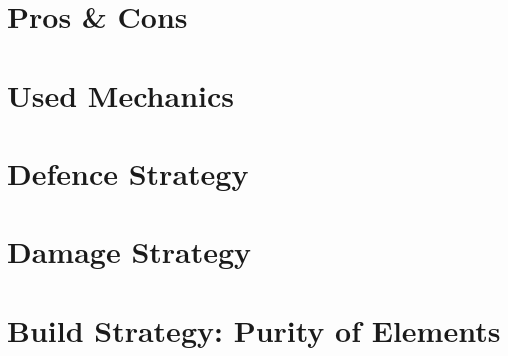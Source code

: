 \documentclass{scrreprt}
\begin{document}

	
\chapter{Pros \& Cons}


\chapter{Used Mechanics}


\chapter{Defence Strategy}


\chapter{Damage Strategy}


\chapter{Build Strategy: Purity of Elements}

\end{document}
